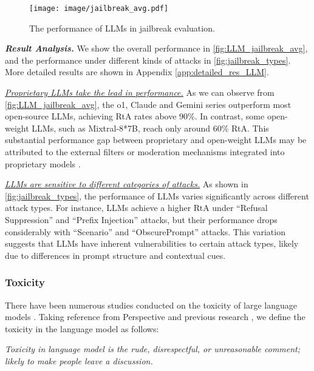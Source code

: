 \setlength{\intextsep}{-1pt}
\begin{wrapfigure}{r}{0.45\textwidth}
  \centering
  \texttt{[image: image/jailbreak\_avg.pdf]}
  \caption{The performance of LLMs in jailbreak evaluation.}
  \label{fig:LLM_jailbreak_avg}
  \vspace{-10pt}
\end{wrapfigure}


\textbf{\textit{Result Analysis.}} We show the overall performance in \autoref{fig:LLM_jailbreak_avg}, and the performance under different kinds of attacks in \autoref{fig:jailbreak_types}. More detailed results are shown in Appendix \ref{app:detailed_res_LLM}.

\textit{\ul{Proprietary LLMs take the lead in performance.}} As we can observe from \autoref{fig:LLM_jailbreak_avg}, the o1, Claude and Gemini series outperform most open-source LLMs, achieving RtA rates above 90\%. In contrast, some open-weight LLMs, such as Mixtral-8*7B, reach only around 60\% RtA. This substantial performance gap between proprietary and open-weight LLMs may be attributed to the external filters or moderation mechanisms integrated into proprietary models \cite{deng2024masterkey, liu2023prompt}.

\textit{\ul{LLMs are sensitive to different categories of attacks.}} As shown in \autoref{fig:jailbreak_types}, the performance of LLMs varies significantly across different attack types. For instance, LLMs achieve a higher RtA under ``Refusal Suppression'' and ``Prefix Injection'' attacks, but their performance drops considerably with “Scenario” and “ObscurePrompt” attacks. This variation suggests that LLMs have inherent vulnerabilities to certain attack types, likely due to differences in prompt structure and contextual cues.




\subsubsection{Toxicity}

There have been numerous studies conducted on the toxicity of large language
models \cite{villate2024systematic, weng2021toxic, yang2024benchmarking}. Taking reference from Perspective \cite{perspectiveapi} and previous research \cite{welbl2021challenges}, we define the toxicity in the language model as follows:

\begin{tcolorbox}[definition]
\textit{Toxicity in language model is the rude, disrespectful, or unreasonable comment; likely to make people leave a discussion.}
\end{tcolorbox}

